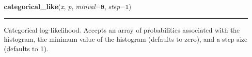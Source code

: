     \label{pymc:distributions:categorical_like}

    \vspace{0.5ex}

\hspace{.8\funcindent}\begin{boxedminipage}{\funcwidth}

    \raggedright \textbf{categorical\_like}(\textit{x}, \textit{p}, \textit{minval}={\tt 0}, \textit{step}={\tt 1})

    \vspace{-1.5ex}

    \rule{\textwidth}{0.5\fboxrule}
\setlength{\parskip}{2ex}

Categorical log-likelihood.
Accepts an array of probabilities associated with the histogram,
the minimum value of the histogram (defaults to zero),
and a step size (defaults to 1).
\setlength{\parskip}{1ex}
    \end{boxedminipage}

    \label{pymc:distributions:cauchy_like}

    \vspace{0.5ex}

